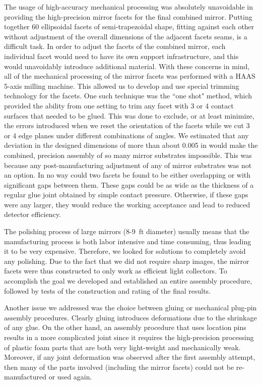 The usage of high-accuracy mechanical processing was absolutely unavoidable in providing the high-precision mirror
facets for the final combined mirror. Putting together 60 ellipsoidal facets of semi-trapezoidal shape, fitting against
each other without adjustment of the overall dimensions of the adjacent facets seams, is a difficult task. In order to
adjust the facets of the combined mirror, each individual facet would need to have its own support infrastructure,
and this would unavoidably introduce additional material. With these concerns in mind, all of the mechanical processing
of the mirror facets was performed with a HAAS 5-axis milling machine. This allowed us to develop and use special
trimming technology for the facets. One such technique was the ``one shot" method, which provided the ability from
one setting to trim any facet with 3 or 4 contact surfaces that needed to be glued. This was done to exclude, or at
least minimize, the errors introduced when we reset the orientation of the facets while we cut 3 or 4 edge planes
under different combinations of angles. We estimated that any deviation in the designed dimensions of more than
about 0.005 in would make the combined, precision assembly of so many mirror substrates impossible. This was
because any post-manufacturing adjustment of any of mirror substrates was not an option. In no way could two facets
be found to be either overlapping or with significant gaps between them. These gaps could be as wide as the thickness
of a regular glue joint obtained by simple contact pressure. Otherwise, if these gaps were any larger, they would
reduce the working acceptance and lead to reduced detector efficiency.

The polishing process of large mirrors (8-9~ft diameter) usually means that the manufacturing process is both
labor intensive and time consuming, thus leading it to be very expensive. Therefore, we looked for solutions to
completely avoid any polishing. Due to the fact that we did not require sharp images, the mirror facets were thus
constructed to only work as efficient light collectors. To accomplish the goal we developed and established an entire
assembly procedure, followed by tests of the construction and rating of the final results.

Another issue we addressed was the choice between gluing or mechanical plug-pin assembly procedures. Clearly
gluing introduces deformations due to the shrinkage of any glue. On the other hand, an assembly procedure that
uses location pins results in a more complicated joint since it requires the high-precision processing of plastic foam
parts that are both very light-weight and mechanically weak. Moreover, if any joint deformation was observed after
the first assembly attempt, then many of the parts involved (including the mirror facets) could not be
re-manufactured or used again.

